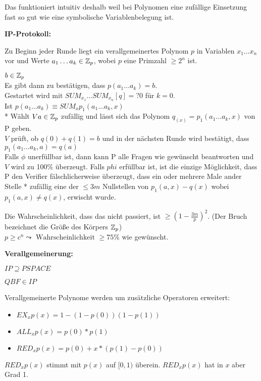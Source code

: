 Das funktioniert intuitiv deshalb weil bei Polynomen eine zufällige Einsetzung
fast so gut wie eine symbolische Variablenbelegung ist.












\textbf{IP-Protokoll:}

Zu Beginn jeder Runde liegt ein verallgemeinertes Polynom $p$ in Variablen $x_1
\dots x_n$ vor und Werte $a_1 \dots a_k \in \mathbb{Z}_p$, wobei $p$ eine Primzahl $\geq
2^n$ ist.

$b \in \mathbb{Z}_p$
\\
Es gibt dann zu bestätigen, dass $p(a_1 \dots a_k) = b$.
\\
Gestartet wird mit
$SUM_{x_1} \dots SUM_{x_n}[q] =? 0$ für $k = 0$.
\\
Ist $p(a_1 \dots a_k) \equiv SUM_x p_1(a_1 \dots a_k, x)$
\\
* Wählt $V a \in \mathbb{Z}_p$ zufällig und lässt sich das Polynom
$q_(x) = p_1(a_1 \dots a_k, x)$
von P geben.
\\
$V$ prüft, ob $q(0) + q(1) = b$ und in der nächsten Runde wird bestätigt, dass
$p_1(a_1 \dots a_k, a) = q(a)$
\\
Falls $\phi$ unerfüllbar ist, dann kann P alle Fragen wie gewünscht beantworten und
$V$ wird zu 100\% überzeugt.
Falls $phi$ erfüllbar ist, ist die einzige Möglichkeit, dass P den Verifier
fälschlicherweise überzeugt, dass ein oder mehrere Male ander Stelle * zufällig
eine der $\leq 3m$ Nullstellen von $p_1(a, x) - q(x)$ wobei $p_1(a, x) \neq
q(x)$, erwischt wurde.

Die Wahrscheinlichkeit, dass das nicht passiert, ist $\geq (1 -
\frac{3m}{p})^2$. (Der Bruch bezeichnet die Größe des Körpers $\mathbb{Z}_p$)
\\
$p \geq c^n \leadsto \text{ Wahrscheinlichkeit } \geq 75\%$ wie gewünscht.






\textbf{Verallgemeinerung:}


$\mathit{IP} \supseteq \mathit{PSPACE}$

$\mathit{QBF} \in \mathit{IP}$

Verallgemeinerte Polynome werden um zusätzliche Operatoren erweitert:
\begin{itemize}
    \item $\mathit{EX}_x p(x) = 1 - (1 - p(0))(1 - p(1))$
    \item $\mathit{ALL}_x p(x) = p(0) * p(1)$
    \item $\mathit{RED}_x p(x) = p(0) + x * (p(1) - p(0))$
\end{itemize}
$\mathit{RED}_x p(x)$ stimmt mit $p(x)$ auf $[0,1)$ überein.
$\mathit{RED}_x p(x)$ hat in $x$ aber Grad 1.

